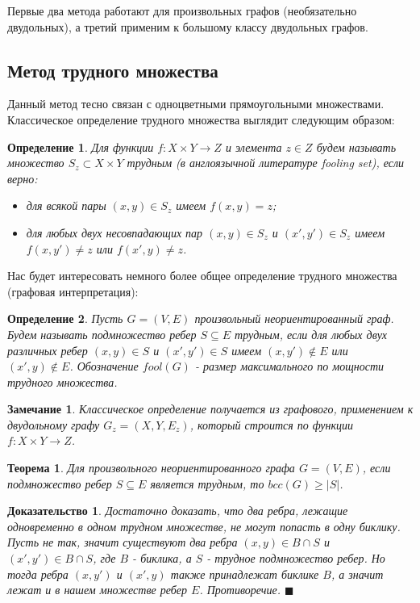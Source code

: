 \documentclass[a4paper]{article}
\newtheorem*{mremark}{Замечание}
\newtheorem*{mdefinition}{Определение}
\newtheorem{mtheorem}{Теорема}[section]
\newtheorem*{msolution}{Доказательство}
\begin{document}
Первые два метода работают для произвольных графов (необязательно двудольных), а третий применим к 
большому классу двудольных графов.

\setcounter{subsection}{0}

\subsection{Метод трудного множества}

Данный метод тесно связан с одноцветными прямоугольными множествами. Классическое определение 
трудного множества выглядит следующим образом:

\begin{mdefinition}
	Для функции $f: X\times Y \rightarrow Z$ и элемента $z\in Z$ будем называть множество 
	$S_z\subset X\times Y$ трудным (в англоязычной литературе fooling set), если верно:
	\begin{itemize}[noitemsep]
		\item для всякой пары $(x, y)\in S_z$ имеем $f(x, y) = z$;
		\item для любых двух несовпадающих пар $(x, y)\in S_z$ и $(x', y')\in S_z$ имеем 
		$f(x, y') \neq z$ или $f(x', y) \neq z$.
	\end{itemize}
\end{mdefinition}

Нас будет интересовать немного более общее определение трудного множества (графовая интерпретация):
\begin{mdefinition}
	Пусть $G = (V, E)$ произвольный неориентированный граф. Будем называть подмножество ребер 
	$S \subseteq E$ трудным, если для любых двух различных ребер $(x, y)\in S$ и $(x', y')\in S$ 
	имеем $(x, y') \notin E$ или $(x', y) \notin E$. Обозначение $fool(G)$ - размер максимального по 
	мощности трудного множества.
\end{mdefinition}

\begin{mremark}
	Классическое определение получается из графового, применением к двудольному графу $G_z = (X, Y, E_z)$, 
	который строится по функции $f: X\times Y \rightarrow Z$.
\end{mremark}

	
\begin{mtheorem}
    Для произвольного неориентированного графа $G = (V, E)$, если подмножество ребер $S \subseteq E$ 
    является трудным, то $bcc(G) \geq |S|$.
\end{mtheorem}

\begin{msolution}
    Достаточно доказать, что два ребра, лежащие одновременно в одном трудном множестве, не могут 
    попасть в одну биклику. Пусть не так, значит существуют два ребра $(x, y)\in B\cap S$ и 
    $(x', y')\in B\cap S$, где $B$ - биклика, а $S$ - трудное подмножество ребер. Но тогда ребра 
    $(x, y')$ и $(x', y)$ также принадлежат биклике $B$, а значит лежат и в нашем множестве ребер 
    $E$. Противоречие. $\blacksquare$
\end{msolution}
\end{document}
